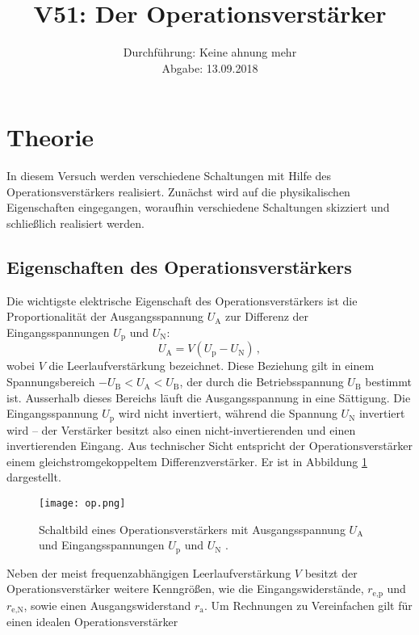 \documentclass[
  bibliography=totoc,     %
  captions=tableheading,  %
  titlepage=firstiscover, %
]{scrartcl}
\title{V51: Der Operationsverstärker}
\author{
  Simon Schulte
  \texorpdfstring{
    \\
    \href{mailto:simon.schulte@udo.edu}{simon.schulte@udo.edu}
  }{}
  \texorpdfstring{\and}{, }
  Tim Sedlaczek
  \texorpdfstring{
    \\
    \href{mailto:tim.sedlaczek@udo.edu}{tim.sedlaczek@udo.edu}
  }{}
}
\date{Durchführung: Keine ahnung mehr\\
      Abgabe: 13.09.2018}
\begin{document}
\maketitle
\thispagestyle{empty}
\setcounter{page}{1}
\section{Theorie}
\label{sec:theorie}
In diesem Versuch werden verschiedene Schaltungen mit Hilfe des
Operationsverstärkers realisiert.
Zunächst wird auf die physikalischen Eigenschaften eingegangen,
woraufhin verschiedene Schaltungen skizziert und schließlich
realisiert werden.

\subsection{Eigenschaften des Operationsverstärkers}
\label{subsec:eigenschaften}
Die wichtigste elektrische Eigenschaft des Operationsverstärkers
ist die Proportionalität der Ausgangsspannung $U_\text{A}$ zur
Differenz der Eingangsspannungen $U_\text{p}$ und $U_\text{N}$:
\begin{equation}
\label{eq:proportionalität}
    U_\text{A} = V(U_\text{p} - U_\text{N})\,,
\end{equation}
wobei $V$ die Leerlaufverstärkung bezeichnet.
Diese Beziehung gilt in einem Spannungsbereich
$-U_\text{B} < U_\text{A} < U_\text{B}$, der durch die Betriebsspannung
$U_\text{B}$ bestimmt ist. Ausserhalb dieses Bereichs läuft die
Ausgangsspannung in eine Sättigung.
Die Eingangsspannung $U_\text{p}$ wird nicht invertiert, während die Spannung
$U_\text{N}$ invertiert wird -- der Verstärker besitzt also einen
nicht-invertierenden und einen invertierenden Eingang.
\noindent
Aus technischer Sicht entspricht der Operationsverstärker einem
gleichstromgekoppeltem Differenzverstärker. Er ist in Abbildung
\ref{fig:op} dargestellt.
\begin{figure}
    \centering
    \texttt{[image: op.png]}
    \caption{
        Schaltbild eines Operationsverstärkers mit Ausgangsspannung
        $U_\text{A}$ und Eingangsspannungen $U_\text{p}$ und
        $U_\text{N}$ \cite{V51}.
    }
    \label{fig:op}
\end{figure}
Neben der meist frequenzabhängigen Leerlaufverstärkung $V$ besitzt der
Operationsverstärker weitere Kenngrößen, wie die Eingangswiderstände,
$r_\text{e,p}$ und $r_\text{e,N}$, sowie
einen Ausgangswiderstand $r_\text{a}$.
Um Rechnungen zu Vereinfachen gilt für einen idealen Operationsverstärker
\end{document}
